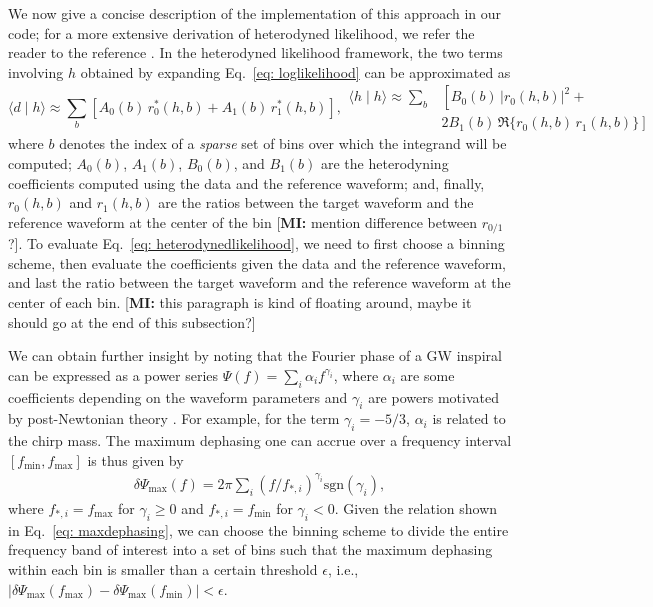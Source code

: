 \documentclass[twocolumn]{aastex631}
\newcommand{\mi}[1]{\textsf{\color{teal}[\textbf{MI:} #1]}}
\begin{document}
We now give a concise description of the implementation of this approach in our
code; for a more extensive derivation of heterodyned likelihood, we refer the
reader to the reference \cite{Zackay:2018qdy}. In the heterodyned likelihood
framework, the two terms involving $h$ obtained by expanding Eq.~\eqref{eq: loglikelihood} can be approximated as
\begin{subequations} \label{eq: heterodynedlikelihood}
\begin{equation}
    \langle d \mid h \rangle \approx \sum_b \left[ A_0(b)\, r^*_0(h,b) + A_1(b)\, r^*_1(h,b) \right] ,
\end{equation}
\begin{align}
    \langle h \mid h \rangle \approx \sum_b &\left[ B_0(b)\, |r_0(h,b)|^2 + \right. \nonumber \\
    &\left. 2 B_1(b)\, \Re\{r_0(h,b)\, r_1(h,b)\} \right] 
\end{align}
\end{subequations} 
where $b$ denotes the index of a \textit{sparse} set of bins over which the integrand
will be computed; $A_0(b)$, $A_1(b)$, $B_0(b)$, and $B_1(b)$ are the
heterodyning coefficients computed using the data and the reference waveform;
and, finally, $r_0(h,b)$ and $r_1(h,b)$ are the ratios between the target waveform and the
reference waveform at the center of the bin \mi{mention difference between $r_{0/1}$?}.
To evaluate Eq.~\eqref{eq:
heterodynedlikelihood}, we need to first choose a binning scheme,
then evaluate the coefficients given the data and the reference waveform, and last the
ratio between the target waveform and the reference waveform at the center of
each bin.
\mi{this paragraph is kind of floating around, maybe it should go at the end of
this subsection?}

We can obtain further insight by noting that the Fourier phase of a GW inspiral
can be expressed as a power series $\Psi(f) = \sum_i \alpha_i f^{\gamma_i}$,
where $\alpha_i$ are some coefficients depending on the waveform parameters and
$\gamma_i$ are powers motivated by post-Newtonian theory \cite{}. For example,
for the term $\gamma_i = -5/3$, $\alpha_i$ is related to the chirp mass. The
maximum dephasing one can accrue over a frequency interval
$[f_{\textrm{min}},f_{\textrm{max}}]$ is thus given by
\begin{align}
    \delta \Psi_{\textrm{max}}(f) = 2\pi \sum_{i} (f/f_{*,i})^{\gamma_i} \textrm{sgn}(\gamma_i),
\label{eq: maxdephasing}
\end{align}
where $f_{*,i} = f_{\textrm{max}}$ for $\gamma_i \geq 0$ and $f_{*,i} =
f_{\textrm{min}}$ for $\gamma_i<0$. Given the relation shown in Eq.~\eqref{eq:
maxdephasing}, we can choose the binning scheme to divide the entire
frequency band of interest into a set of bins such that the maximum dephasing
within each bin is smaller than a certain threshold $\epsilon$, i.e.,
$|\delta\Psi_{\textrm{max}}(f_{\textrm{max}}) -
\delta\Psi_{\textrm{max}}(f_{\textrm{min}})| < \epsilon$. 
\end{document}
